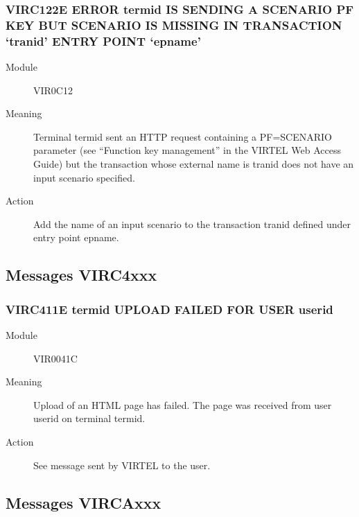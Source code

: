 \documentclass[letterpaper,10pt,english]{sphinxmanual}
\begin{document}
\subsubsection{VIRC122E ERROR termid IS SENDING A SCENARIO PF KEY BUT SCENARIO IS MISSING IN TRANSACTION ‘tranid’ ENTRY POINT ‘epname’}
\label{\detokenize{messages:virc122e-error-termid-is-sending-a-scenario-pf-key-but-scenario-is-missing-in-transaction-tranid-entry-point-epname}}\begin{description}
\item[{Module}] \leavevmode
VIR0C12

\item[{Meaning}] \leavevmode
Terminal termid sent an HTTP request containing a PF=SCENARIO parameter (see “Function key management” in  the VIRTEL Web Access Guide) but the transaction whose external name is tranid does not have an input scenario specified.

\item[{Action}] \leavevmode
Add the name of an input scenario to the transaction tranid defined under entry point epname.

\end{description}


\subsection{Messages VIRC4xxx}
\label{\detokenize{messages:messages-virc4xxx}}

\subsubsection{VIRC411E termid UPLOAD FAILED FOR USER userid}
\label{\detokenize{messages:virc411e-termid-upload-failed-for-user-userid}}\begin{description}
\item[{Module}] \leavevmode
VIR0041C

\item[{Meaning}] \leavevmode
Upload of an HTML page has failed. The page was received from user userid on terminal termid.

\item[{Action}] \leavevmode
See message sent by VIRTEL to the user.

\end{description}


\subsection{Messages VIRCAxxx}
\label{\detokenize{messages:messages-vircaxxx}}
\end{document}
